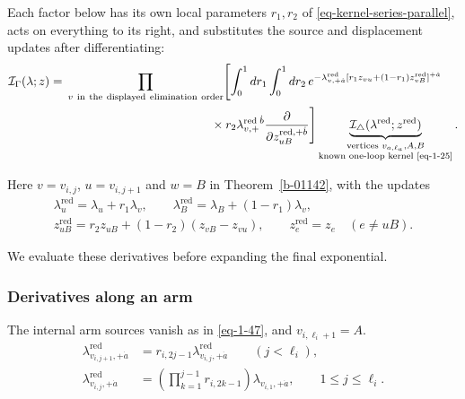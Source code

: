 \documentclass[11pt]{article}
\numberwithin{equation}{section}
\numberwithin{figure}{section}
\numberwithin{table}{section}
\begin{document}
Each factor below has its own local parameters $r_1,r_2$ of \eqref{eq-kernel-series-parallel}, acts on everything to its right, and substitutes the source and displacement updates after differentiating:
\begin{equation*}
\begin{aligned}
    \mathcal I_\Gamma(\lambda;z)
    ={}&\prod_{\substack{v\ \mathrm{in\ the\ displayed\ elimination\ order}}}
    \Biggl[
    \int_0^1dr_1\int_0^1dr_2\,
    e^{-\lambda_{v,+\dot a}^{\mathrm{red}}
    [r_1z_{vu}+(1-r_1)z_{vB}^{\mathrm{red}}]^{+\dot a}}\\
    &\hspace{42mm}\times r_2\lambda_{v,+}^{\mathrm{red}}{}^{\dot b}
    \frac{\partial}{\partial z_{uB}^{\mathrm{red},+\dot b}}
    \Biggr]
    \underbrace{\mathcal I_\triangle
    (\lambda^{\mathrm{red}};z^{\mathrm{red}})}_{\substack{\text{vertices }v_{a,\ell_a},A,B\\\text{known one-loop kernel \eqref{eq-1-25}}}}.
    \end{aligned}
\end{equation*}

Here $v=v_{i,j}$, $u=v_{i,j+1}$ and $w=B$ in Theorem~\ref{b-01142}, with the updates
\begin{equation*}
\begin{gathered}
\lambda_u^{\mathrm{red}}=\lambda_u+r_1\lambda_v,\qquad
\lambda_B^{\mathrm{red}}=\lambda_B+(1-r_1)\lambda_v,\\
z_{uB}^{\mathrm{red}}=r_2z_{uB}+(1-r_2)(z_{vB}-z_{vu}),
\qquad z_e^{\mathrm{red}}=z_e\quad(e\ne uB).
\end{gathered}
\end{equation*}

We evaluate these derivatives before expanding the final exponential.

\subsubsection{Derivatives along an arm}\label{local-B5-arms-heading}

The internal arm sources vanish as in \eqref{eq-1-47}, and $v_{i,\ell_i+1}=A$.
\begin{equation}\label{eq-spider-reduced-data}
\begin{aligned}
\lambda_{v_{i,j+1},+\dot a}^{\mathrm{red}}
&=r_{i,2j-1}\lambda_{v_{i,j},+\dot a}^{\mathrm{red}}
\qquad(j<\ell_i),\\
\lambda_{v_{i,j},+\dot a}^{\mathrm{red}}
&=\left(\prod_{k=1}^{j-1}r_{i,2k-1}\right)
\lambda_{v_{i,1},+\dot a},\qquad 1\le j\le\ell_i.
\end{aligned}
\end{equation}
\end{document}
